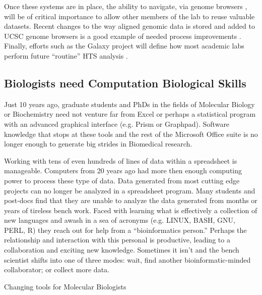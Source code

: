     Once these systems are in place, the ability to navigate, via genome browsers \citep{Zweig2008,Robinson2011}, will be of critical importance to allow other members of the lab to reuse valuable datasets. Recent changes to the way aligned genomic data is stored and added to UCSC genome browsers is a good example of needed process improvements \citep{Raney2013}. Finally, efforts such as the Galaxy project will define how most academic labs perform future ``routine'' HTS analysis \citep{Blankenberg2010}.

  \subsection{Biologists need Computation Biological Skills}
    \label{Disc:subsec:Biologists need Comp Skills}

    Just 10 years ago, graduate students and PhDs in the fields of Molecular Biology or Biochemistry need not venture far from Excel or perhaps a statistical program with an advanced graphical interface (e.g. Prism or Graphpad). Software knowledge that stops at these tools and the rest of the Microsoft Office suite is no longer enough to generate big strides in Biomedical research.

    Working with tens of even hundreds of lines of data within a spreadsheet is manageable. Computers from 20 years ago had more then enough computing power to process these type of data. Data generated from most cutting edge projects can no longer be analyzed in a spreadsheet program. Many students and post-docs find that they are unable to analyze the data generated from months or years of tireless bench work. Faced with learning what is effectively a collection of new languages and awash in a sea of acronyms (e.g. LINUX, BASH, GNU, PERL, R) they reach out for help from a ``bioinformatics person.'' Perhaps the relationship and interaction with this personal is productive, leading to a collaboration and exciting new knowledge. Sometimes it isn't and the bench scientist shifts into one of three modes: wait, find another bioinformatic-minded collaborator; or collect more data.

    \begin{table} %
      \caption[Changing tools for Molecular Biologists] 
        {
         Changing tools for Molecular Biologists
         }
       \label{Disc:tab:Comp tools for Molecular Biology}
       
       \end{table}

